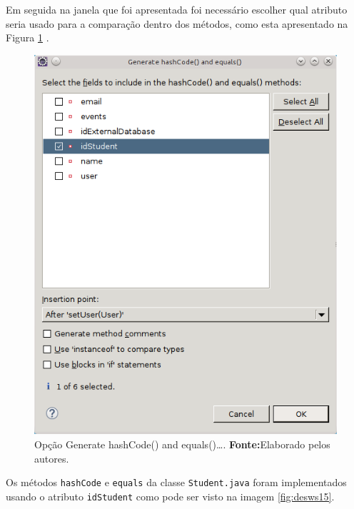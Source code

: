 	\pagebreak
	
	\par Em seguida na janela que foi apresentada foi necessário escolher qual
atributo seria usado para a comparação dentro dos métodos, como esta
apresentado na Figura \ref{fig:desws14} .
	
	\begin{figure}[h!]
		\centerline{\includegraphics[scale=0.8]{./imagens/2_q_metodologico/4_procedimentos_resultados/43_webservice/432_desenvolvimento/desws14.png}}
		\caption[Opção Generate hashCode() and equals()\ldots]{Opção Generate
		hashCode() and equals()\ldots .
			\textbf{Fonte:}Elaborado pelos autores.}
		\label{fig:desws14}
	\end{figure}
	
	\par Os métodos \texttt{hashCode} e \texttt{equals} da classe \texttt{Student.java}
foram implementados\\ usando o atributo \texttt{idStudent} como pode ser visto
na imagem \ref{fig:desws15}.

